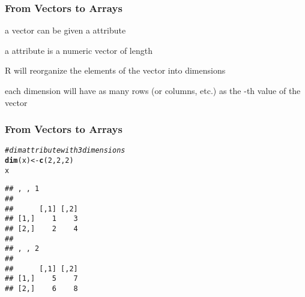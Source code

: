 \documentclass[12pt]{beamer}\usepackage[]{graphicx}\usepackage[]{color}
\makeatletter
\newcommand{\hlnum}[1]{\textcolor[rgb]{0.686,0.059,0.569}{#1}}%
\newcommand{\hlcom}[1]{\textcolor[rgb]{0.678,0.584,0.686}{\textit{#1}}}%
\newcommand{\hlstd}[1]{\textcolor[rgb]{0.345,0.345,0.345}{#1}}%
\newcommand{\hlkwb}[1]{\textcolor[rgb]{0.69,0.353,0.396}{#1}}%
\newcommand{\hlkwd}[1]{\textcolor[rgb]{0.737,0.353,0.396}{\textbf{#1}}}%
\newenvironment{kframe}{%
 \def\at@end@of@kframe{}%
 \ifinner\ifhmode%
  \def\at@end@of@kframe{\end{minipage}}%
  \begin{minipage}{\columnwidth}%
 \fi\fi%
 \def\FrameCommand##1{\hskip\@totalleftmargin \hskip-\fboxsep
 \colorbox{shadecolor}{##1}\hskip-\fboxsep
     \hskip-\linewidth \hskip-\@totalleftmargin \hskip\columnwidth}%
 \MakeFramed {\advance\hsize-\width
   \@totalleftmargin\z@ \linewidth\hsize
   \@setminipage}}%
 {\par\unskip\endMakeFramed%
 \at@end@of@kframe}
\newenvironment{knitrout}{}{} %
\makeatother
\begin{document}

\begin{frame}[fragile]
\frametitle{From Vectors to Arrays}

\bi
  \item a vector can be given a  attribute
  \item a  attribute is a numeric vector of length 
  \item R will reorganize the elements of the vector into  dimensions
  \item each dimension will have as many rows (or columns, etc.) as the -th value of the  vector
\ei

\end{frame}


\begin{frame}[fragile]
\frametitle{From Vectors to Arrays}

\begin{knitrout}\footnotesize
{}\color{fgcolor}\begin{kframe}
\begin{alltt}
\hlcom{# dim attribute with 3 dimensions}
\hlkwd{dim}\hlstd{(x)} \hlkwb{<-} \hlkwd{c}\hlstd{(}\hlnum{2}\hlstd{,} \hlnum{2}\hlstd{,} \hlnum{2}\hlstd{)}
\hlstd{x}
\end{alltt}
\begin{verbatim}
## , , 1
## 
##      [,1] [,2]
## [1,]    1    3
## [2,]    2    4
## 
## , , 2
## 
##      [,1] [,2]
## [1,]    5    7
## [2,]    6    8
\end{verbatim}
\end{kframe}
\end{knitrout}

\end{frame}

\end{document}
